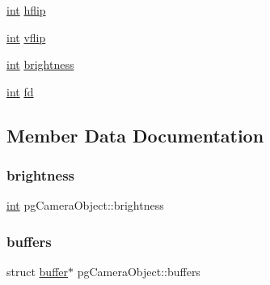 \begin{DoxyCompactItemize}
\item 
\mbox{\hyperlink{warnings_8h_a74f207b5aa4ba51c3a2ad59b219a423b}{int}} \mbox{\hyperlink{structpg_camera_object_ada4373b31446c2a8c32f7dff337e4ecb}{hflip}}
\item 
\mbox{\hyperlink{warnings_8h_a74f207b5aa4ba51c3a2ad59b219a423b}{int}} \mbox{\hyperlink{structpg_camera_object_ae1a6d26813772f7fe9e13416ca05f1b8}{vflip}}
\item 
\mbox{\hyperlink{warnings_8h_a74f207b5aa4ba51c3a2ad59b219a423b}{int}} \mbox{\hyperlink{structpg_camera_object_aaac3cedd323734e0f72e51afc89e9bb7}{brightness}}
\item 
\mbox{\hyperlink{warnings_8h_a74f207b5aa4ba51c3a2ad59b219a423b}{int}} \mbox{\hyperlink{structpg_camera_object_ae94b469ef0f316a7c9d534874cd836ba}{fd}}
\end{DoxyCompactItemize}


\subsection{Member Data Documentation}
\mbox{\label{structpg_camera_object_aaac3cedd323734e0f72e51afc89e9bb7}} 
\subsubsection{\texorpdfstring{brightness}{brightness}}
{\footnotesize\ttfamily \mbox{\hyperlink{warnings_8h_a74f207b5aa4ba51c3a2ad59b219a423b}{int}} pg\+Camera\+Object\+::brightness}

\mbox{\label{structpg_camera_object_a2ca9a8669a392fd341ecaec028fcf428}} 
\subsubsection{\texorpdfstring{buffers}{buffers}}
{\footnotesize\ttfamily struct \mbox{\hyperlink{classbuffer}{buffer}}$\ast$ pg\+Camera\+Object\+::buffers}

\mbox{\label{structpg_camera_object_afd92ace99e80b897f7efd64340a40dd1}} 
